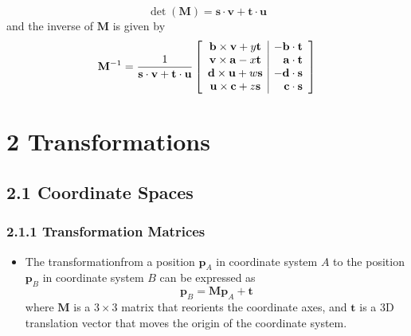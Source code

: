 \documentclass[11pt]{article}
\newcommand{\bm}[1]{\mathbf{#1}}
\begin{document}
\begin{itemize}
\begin{equation}
            \det \left(\bm{M}\right) = \bm{s} \cdot \bm{v} + \bm{t} \cdot \bm{u}
        \end{equation}
        and the inverse of $\bm{M}$ is given by
        \begin{equation}
            \bm{M}^{-1} = \frac{1}{\bm{s} \cdot \bm{v} + \bm{t} \cdot \bm{u}}
            \left[
            \begin{array}{c | r}
                \bm{b} \times \bm{v} + y\bm{t} & -\bm{b} \cdot \bm{t} \\
                \bm{v} \times \bm{a} - x\bm{t} & \bm{a} \cdot \bm{t} \\
                \bm{d} \times \bm{u} + w\bm{s} & -\bm{d} \cdot \bm{s} \\
                \bm{u} \times \bm{c} + z\bm{s} & \bm{c} \cdot \bm{s}
            \end{array}
            \right]
    \end{equation}
\end{itemize}

\section*{2 Transformations}
\subsection*{2.1 Coordinate Spaces}
\subsubsection*{2.1.1 Transformation Matrices}
\begin{itemize}
    \item The transformationfrom a position $\bm{p}_A$ in coordinate system $A$
        to the position $\bm{p}_B$ in coordinate system $B$ can be expressed as
        \begin{equation}
            \bm{p}_B = \bm{M}\bm{p}_A + \bm{t}
        \end{equation}
        where $\bm{M}$ is a $3 \times 3$ matrix that reorients the coordinate axes,
        and $\bm{t}$ is a 3D translation vector that moves the origin of the
        coordinate system.
\end{itemize}
\end{document}
